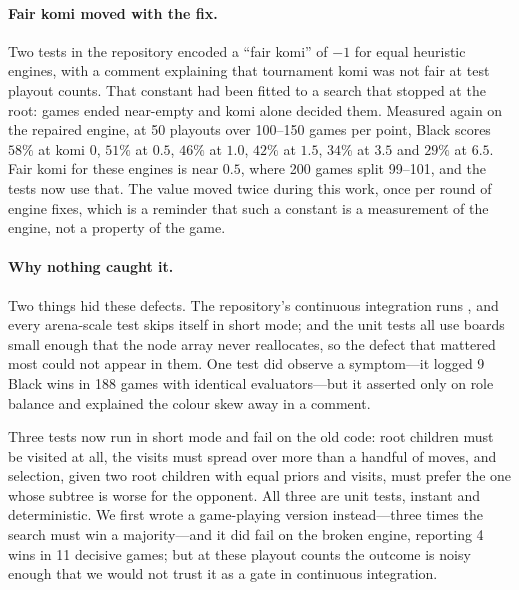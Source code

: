 \paragraph{Fair komi moved with the fix.}
\label{sec:pipeline-found-komi}
Two tests in the repository encoded a ``fair komi'' of $-1$ for equal heuristic
engines, with a comment explaining that tournament komi was not fair at test
playout counts. That constant had been fitted to a search that stopped at the
root: games ended near-empty and komi alone decided them. Measured again on the
repaired engine, at 50 playouts over 100--150 games per point, Black scores
$58\%$ at komi 0, $51\%$ at $0.5$, $46\%$ at $1.0$, $42\%$ at $1.5$, $34\%$ at
$3.5$ and $29\%$ at $6.5$. Fair komi for these engines is near $0.5$, where 200
games split 99--101, and the tests now use that. The value moved twice during
this work, once per round of engine fixes, which is a reminder that such a
constant is a measurement of the engine, not a property of the game.

\paragraph{Why nothing caught it.}
Two things hid these defects. The repository's continuous integration runs
, and every arena-scale test skips itself in short
mode; and the unit tests all use boards small enough that the node array never
reallocates, so the defect that mattered most could not appear in them. One test
did observe a symptom---it logged 9 Black wins in 188 games with identical
evaluators---but it asserted only on role balance and explained the colour skew
away in a comment.

Three tests now run in short mode and fail on the old code: root children must
be visited at all, the visits must spread over more than a handful of moves, and
selection, given two root children with equal priors and visits, must prefer the
one whose subtree is worse for the opponent. All three are unit tests, instant
and deterministic. We first wrote a game-playing version instead---three times
the search must win a majority---and it did fail on the broken engine, reporting
4 wins in 11 decisive games; but at these playout counts the outcome is noisy
enough that we would not trust it as a gate in continuous integration.


